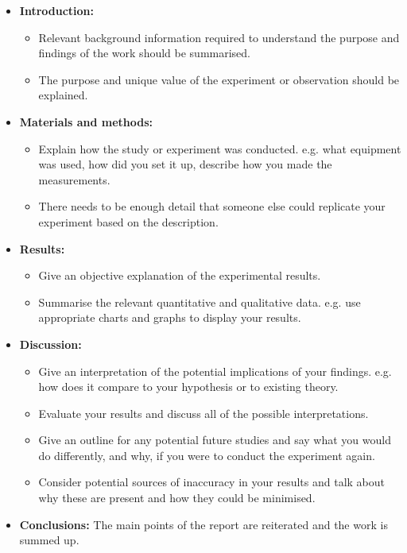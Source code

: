 \documentclass[a4paper,12pt]{book}
\begin{document}
\begin{itemize}
\setlength{\itemsep}{-5pt}
    \item \textbf{Introduction:}
    \begin{itemize}
\setlength{\itemsep}{-5pt}
    \item Relevant background information required to understand the purpose and findings of the work should be summarised.
    \item The purpose and unique value of the experiment or observation should be explained.
\end{itemize}
    \item \textbf{Materials and methods:}
    \begin{itemize}
\setlength{\itemsep}{-5pt}
    \item Explain how the study or experiment was conducted. e.g. what equipment was used, how did you set it up, describe how you made the measurements.
    \item There needs to be enough detail that someone else could replicate your experiment based on the description.
\end{itemize}
    \item \textbf{Results:}
    \begin{itemize}
\setlength{\itemsep}{-5pt}
    \item Give an objective explanation of the experimental results.
    \item Summarise the relevant quantitative and qualitative data. e.g. use appropriate charts and graphs to display your results.
\end{itemize}
    \item \textbf{Discussion:}
    \begin{itemize}
\setlength{\itemsep}{-5pt}
    \item Give an interpretation of the potential implications of your findings. e.g. how does it compare to your hypothesis or to existing theory. 
    \item Evaluate your results and discuss all of the possible interpretations.
    \item Give an outline for any potential future studies and say what you would do differently, and why, if you were to conduct the experiment again.
    \item Consider potential sources of inaccuracy in your results and talk about why these are present and how they could be minimised.
\end{itemize}
    \item \textbf{Conclusions:} The main points of the report are reiterated and the work is summed up.
\end{itemize}
\end{document}
